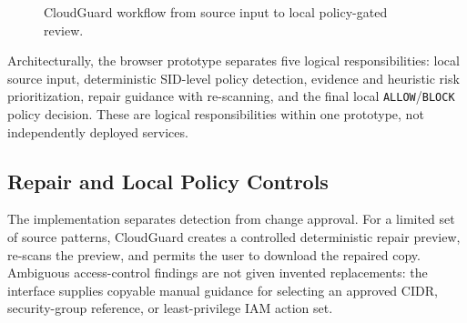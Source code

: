 \documentclass[conference]{IEEEtran}
\begin{document}
\begin{figure}[t]
\centering
{}%
\caption{CloudGuard workflow from source input to local policy-gated review.}
\label{fig:architecture}
\end{figure}

Architecturally, the browser prototype separates five logical responsibilities: local source input, deterministic SID-level policy detection, evidence and heuristic risk prioritization, repair guidance with re-scanning, and the final local \texttt{ALLOW}/\texttt{BLOCK} policy decision. These are logical responsibilities within one prototype, not independently deployed services.

\subsection{Repair and Local Policy Controls}
The implementation separates detection from change approval. For a limited set of source patterns, CloudGuard creates a controlled deterministic repair preview, re-scans the preview, and permits the user to download the repaired copy. Ambiguous access-control findings are not given invented replacements: the interface supplies copyable manual guidance for selecting an approved CIDR, security-group reference, or least-privilege IAM action set.
\end{document}
